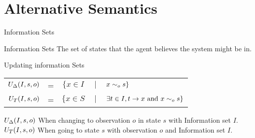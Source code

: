 \section{Alternative Semantics}
\begin{frame}{Information Sets}

  \begin{block}{Information Sets}
    The set of states that the agent believes the system might be in.
  \end{block}
  \vfill
  \begin{block}{Updating information Sets}
    \begin{tabular}{r c c c l}
    $U_{\Delta}(I,s,o)$& = &$\{x\in I$ & $~|~$ & $x\sim_{o}s\}$\\
    $U_T(I,s,o)$& = &$\{x\in S$ & $~|~$ & $\exists t\in I, t\rightarrow x ~\text{and}~ x\sim_{o}s\}$\\
    \end{tabular}
    
    $U_{\Delta}(I,s,o)$ When changing to observation $o$ in state $s$ with Information set $I$.\\
    $U_T(I,s,o)$ When going to state $s$ with observation $o$ and Information set $I$.
  \end{block}
\end{frame}


